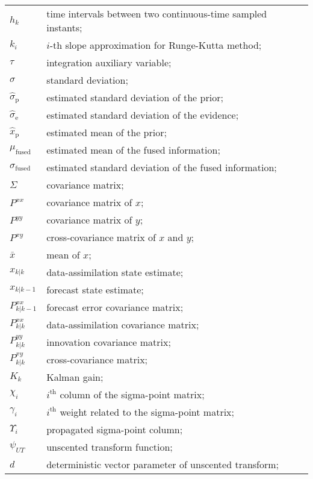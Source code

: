 \begin{longtable}{ll}
	$h_k$					& time intervals between two continuous-time sampled instants; \\

	$k_i$					& $i$-th slope approximation for Runge-Kutta method; \\
	
	$\tau$					& integration auxiliary variable; \\ 
	$\sigma$				& standard deviation; \\
	$\hat{\sigma}_{\textrm{p}}$	& estimated standard deviation of the prior; \\
	$\hat{\sigma}_{\textrm{e}}$	& estimated standard deviation of the evidence; \\
	$\hat{x}_{\textrm{p}}$	& estimated mean of the prior; \\
	
	$\mu_{\textrm{fused}}$	& estimated mean of the fused information; \\
	$\sigma_{\textrm{fused}}$	& estimated standard deviation of the fused information; \\
	$\Sigma$				& covariance matrix; \\


	$P^{xx}$				& covariance matrix of $x$; \\
	$P^{yy}$				& covariance matrix of $y$; \\
	$P^{xy}$				& cross-covariance matrix of $x$ and $y$; \\
	$\bar{x}$				& mean of $x$; \\
	
	$x_{k|k}$				& data-assimilation state estimate; \\
	$x_{k|k-1}$			& forecast state estimate; \\
	$P^{xx}_{k|k-1}$		& forecast error covariance matrix; \\
	$P^{xx}_{k|k}$			& data-assimilation covariance matrix; \\
	$P^{yy}_{k|k}$			& innovation covariance matrix; \\
	$P^{xy}_{k|k}$			& cross-covariance matrix; \\
	$K_k$					& Kalman gain; \\
	$\chi_i$				& $i^{\textrm{th}}$  column of the sigma-point matrix; \\
	$\gamma_i$				& $i^{\textrm{th}}$  weight related to the sigma-point matrix; \\
	$\Upsilon_i$			& propagated sigma-point column; \\
	$\psi_{UT}$				& unscented transform function; \\
	$d$						& deterministic vector parameter of unscented transform; \\
	

\end{longtable}
